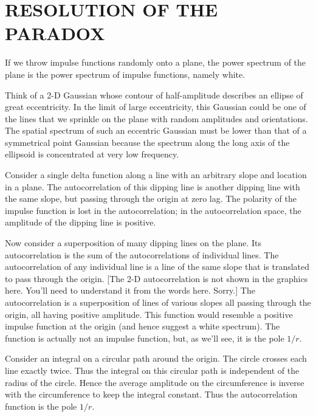 \section{RESOLUTION OF THE PARADOX}

If we throw impulse functions randomly onto a plane,
the power spectrum of the plane
is the power spectrum of impulse functions, namely white.
\par
Think of a 2-D Gaussian whose contour of half-amplitude describes
an ellipse of great eccentricity.
In the limit of large eccentricity,
this Gaussian could be one of the lines that we sprinkle on the plane
with random amplitudes and orientations.
The spatial spectrum of such an eccentric Gaussian
must be lower than that of a symmetrical point Gaussian
because the spectrum along the long axis of the ellipsoid
is concentrated at very low frequency.

\par
Consider a single delta function along a line with
an arbitrary slope and location in a plane.
The autocorrelation of this dipping line
is another dipping line with the same slope,
but passing through the origin at zero lag.
The polarity of the impulse function is lost in the autocorrelation;
in the autocorrelation space,
the amplitude of the dipping line is positive.

\par
Now consider a superposition of many dipping lines on the plane.
Its autocorrelation is the sum of the autocorrelations of individual lines.
The autocorrelation of any individual line is a line of 
the same slope that is translated to pass through the origin.
[The 2-D autocorrelation is not shown in the graphics here.
You'll need to understand it from the words here.  Sorry.]
The autocorrelation is a superposition of lines of various slopes
all passing through the origin, all having positive amplitude.
This function would resemble a positive impulse function at the origin
(and hence suggest a white spectrum).
The function is actually not an impulse function,
but, as we'll see, it is the pole $1/r$.

\par
Consider an integral on a circular path around the origin.
The circle crosses each line exactly twice.
Thus the integral on this circular path
is independent of the radius of the circle.
Hence the average amplitude on the circumference
is inverse with the circumference to keep the integral constant.
Thus the autocorrelation function is the pole $1/r$.

